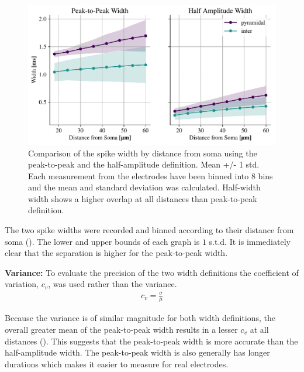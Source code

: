 \documentclass[altfont, fleqn]{uiophd}
\renewcommand{\cref}[1]{{\color{viridis_03}\mycref{#1}}}
\begin{document}
\begin{figure}[h]
    \begin{center}
        \includegraphics[width=\textwidth]{images/sec_4/int_pyr_widths_dist.pdf}
        \caption{
            Comparison of the spike width by distance from soma using the peak-to-peak
            and the half-amplitude definition.
            Mean +/- 1 std.
            Each measurement from the electrodes have been binned into 8 bins
            and the mean and standard deviation was calculated. 
            Half-width width shows a higher overlap at all distances than peak-to-peak
            definition. 
        }
        \label{fig:4_width}
    \end{center}
\end{figure}

The two spike widths were recorded and binned according 
to their distance from soma
(\cref{fig:4_width}).
The lower and upper bounds of each graph is 
$1$ s.t.d.
It is immediately clear that the separation 
is higher for the peak-to-peak width. 
\newline

\noindent
\textbf{Variance:}
To evaluate the precision of the two width definitions
the coefficient of variation, $c_v$,
was used rather than the variance. 
\begin{align}
    c_v = \frac{\sigma}{\mu}
\end{align}

Because the variance is of similar magnitude for both width definitions, 
the overall greater mean of the peak-to-peak width results in a
lesser $c_v$ at all distances 
(\cref{fig:4_width_snr}).
This suggests that 
the peak-to-peak width
is more accurate than the half-amplitude width. 
The peak-to-peak width is also generally has longer 
durations which makes it easier to measure for real electrodes. 
\end{document}
